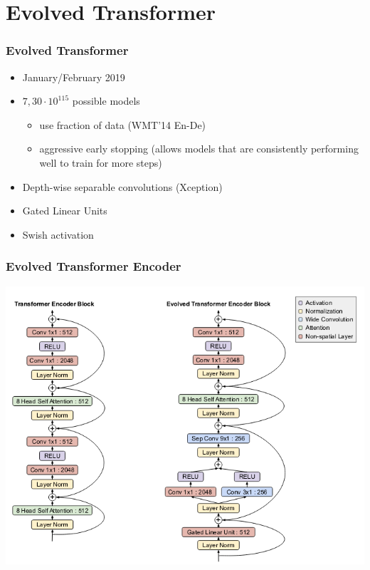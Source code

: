 \documentclass{beamer}
\begin{document}
\section{Evolved Transformer}
\begin{frame}
    \frametitle{Evolved Transformer \cite{evolved}}
    \begin{itemize}
        \item January/February 2019
        \item $7,30 \cdot 10^{115}$ possible models
        \begin{itemize}
            \item use fraction of data (WMT'14 En-De)
            \item aggressive early stopping (allows models that are consistently performing well to train for more steps)
        \end{itemize}
        \item Depth-wise separable convolutions (Xception\cite{xception})
        \item Gated Linear Units
        \item Swish activation
    \end{itemize}
\end{frame}

\begin{frame}
    \frametitle{Evolved Transformer Encoder}
    \begin{center}
        \includegraphics[scale=1.5]{img/evolved-transformer-encoder.png}
    \end{center}
\end{frame}
\end{document}
